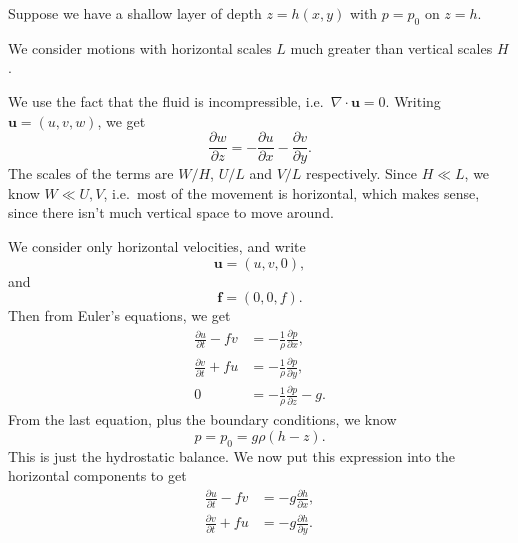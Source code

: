\documentclass[a4paper]{article}
\begin{document}
Suppose we have a shallow layer of depth $z = h(x, y)$ with $p = p_0$ on $z = h$.
\begin{center}
\end{center}
We consider motions with horizontal scales $L$ much greater than vertical scales $H$.

We use the fact that the fluid is incompressible, i.e.\ $\nabla \cdot \mathbf{u} = 0$. Writing $\mathbf{u} = (u, v, w)$, we get
\[
\frac{\partial w}{\partial z} = -\frac{\partial u}{\partial x} - \frac{\partial v}{\partial y}.
\]
The scales of the terms are $W/H$, $U/L$ and $V/L$ respectively. Since $H \ll L$, we know $W \ll U, V$, i.e.\ most of the movement is horizontal, which makes sense, since there isn't much vertical space to move around.

We consider only horizontal velocities, and write
\[
\mathbf{u} = (u, v, 0),
\]
and
\[
\mathbf{f} = (0, 0, f).
\]
Then from Euler's equations, we get
\begin{align*}
\frac{\partial u}{\partial t} - fv &= -\frac{1}{\rho} \frac{\partial p}{\partial x},\\
\frac{\partial v}{\partial t} + fu &= -\frac{1}{\rho} \frac{\partial p}{\partial y},\\
0 &= -\frac{1}{\rho}\frac{\partial p}{\partial z} -g.
\end{align*}
From the last equation, plus the boundary conditions, we know
\[
p = p_0 = g\rho(h - z).
\]
This is just the hydrostatic balance. We now put this expression into the horizontal components to get
\begin{align*}
\frac{\partial u}{\partial t} - fv &= -g\frac{\partial h}{\partial x},\\
\frac{\partial v}{\partial t} + fu &= -g\frac{\partial h}{\partial y}.
\end{align*}
\end{document}
